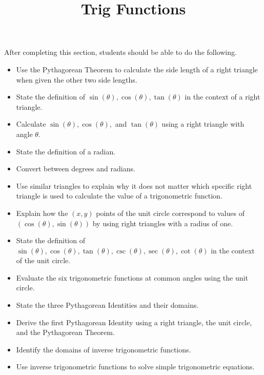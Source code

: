 \documentclass{ximera}
\title{Trig Functions}
\begin{document}
\begin{abstract} 
\end{abstract}

\maketitle

\begin{sectionOutcomes}
After completing this section, students should be able to do the following.

\begin{itemize}
	\item Use the Pythagorean Theorem to calculate the side length of a right triangle when given the other two side lengths. 
    \item State the definition of $\sin(\theta), \cos(\theta), \tan(\theta)$ in the context of a right triangle.
    \item Calculate $\sin(\theta), \cos(\theta),$ and $\tan(\theta)$ using a right triangle with angle $\theta$.
    \item State the definition of a radian.
    \item Convert between degrees and radians.
    \item Use similar triangles to explain why it does not matter which specific right triangle is used to calculate the value of a trigonometric function.
    \item Explain how the $(x,y)$ points of the unit circle correspond to values of $(\cos(\theta), \sin(\theta))$ by using right triangles with a radius of one.
    \item State the definition of $\sin(\theta), \cos(\theta), \tan(\theta), \csc(\theta), \sec(\theta), \cot(\theta)$ in the context of the unit circle.
    \item Evaluate the six trigonometric functions at common angles using the unit circle.
    \item State the three Pythagorean Identities and their domains. 
    \item Derive the first Pythagorean Identity using a right triangle, the unit circle, and the Pythagorean Theorem.
    \item Identify the domains of inverse trigonometric functions.
    \item Use inverse trigonometric functions to solve simple trigonometric equations. 

\end{itemize}
\end{sectionOutcomes}
\end{document}
